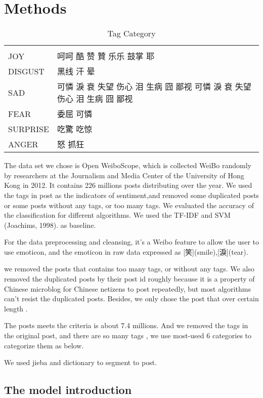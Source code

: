 \chapter{Methods}

\begin{table}[]
\centering
\caption{Tag Category}
\label{CategoryTable}
\begin{tabular}{ll}
      &  \\
JOY  & 呵呵 酷 赞 贊 乐乐 鼓掌 耶 \\
DISGUST & 黑线 汗 晕 \\
SAD &   可憐 淚 衰 失望 伤心 泪 生病 囧 鄙视  可憐 淚 衰 失望 伤心 泪 生病 囧 鄙视  \\
FEAR &  委屈  可憐 \\
SURPRISE &  吃驚 吃惊 \\
ANGER & 怒 抓狂
\end{tabular}
\end{table}

The data set we chose is Open WeiboScope, which is collected WeiBo randomly by researchers at the Journalism and Media Center of the University of Hong Kong in 2012. It contains 226 millions posts distributing over the year. We used the tags in post as the indicators of sentiment,and removed some duplicated posts or some posts without any tags, or too many tags. We evaluated the accuracy of the classification for different algorithms.  We used the TF-IDF and SVM (Joachims, 1998). as baseline.

For the data preprocessing and cleansing, it's a Weibo feature to allow the user to use emoticon, and the emoticon in raw data expressed as [笑](smile),[淚](tear).

we removed the posts that contains too many tags, or without any tags. We also removed the duplicated posts by their post id roughly because it is a property of Chinese microblog \cite{fu2013reality} for Chinese netizens to post repeatedly, but most algorithms can't resist the duplicated posts. Besides, we only chose the post that over certain length .

The posts meets the criteria is about 7.4 millions. And we removed the tags in the original post, and there are so many tags , we use most-used 6 categories to categorize them as below.

We used jieba and dictionary to segment to post.



\section{The model introduction}

